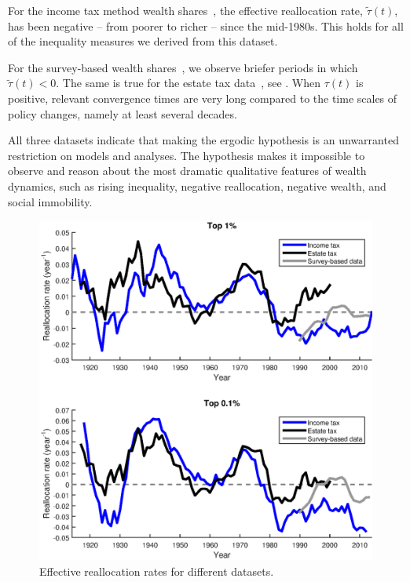 For the income tax method wealth shares~\cite{SaezZucman2014}, the effective reallocation rate, $\widetilde{\tau}\left(t\right)$, has been negative -- \ie from poorer to richer -- since the mid-1980s. This holds for all of the inequality measures we derived from this dataset.

For the survey-based wealth shares~\cite{bricker2016measuring2}, we observe briefer periods in which $\widetilde{\tau}\left(t\right) < 0$. The same is true for the estate tax data~\cite{kopczuk2004top}, see . When $\tau\left(t\right)$ is positive, relevant convergence times are very long compared to the time scales of policy changes, namely at least several decades.

All three datasets indicate that making the ergodic hypothesis is an unwarranted restriction on models and analyses. The hypothesis makes it impossible to observe and reason about the most dramatic qualitative features of wealth dynamics, such as rising inequality, negative reallocation, negative wealth, and social immobility.

\begin{figure}[!htb]
\centering
\includegraphics[width=1.0\textwidth] {./chapter_3/figs/tau_top1_top0i1_datasets.eps}
\caption{Effective reallocation rates for different datasets.}
\end{figure}

